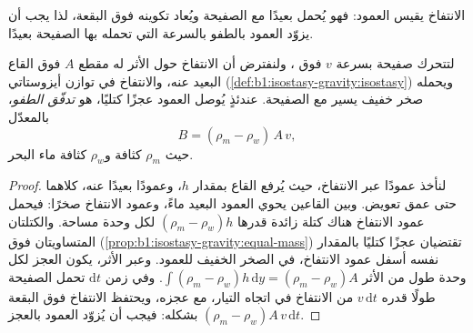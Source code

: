 الانتفاخ يقيس العمود: فهو يُحمل بعيدًا مع الصفيحة ويُعاد تكوينه فوق البقعة، لذا يجب أن يزوّد العمود بالطفو بالسرعة التي تحمله بها الصفيحة بعيدًا.

\begin{proposition}\label{prop:b1:hotspots:buoyancy}
لتتحرك صفيحة بسرعة $v$ فوق ، ولنفترض أن الانتفاخ حول الأثر له مقطع $A$ فوق القاع البعيد عنه، والانتفاخ في توازن أيزوستاتي (\cref{def:b1:isostasy-gravity:isostasy}) ويحمله صخر خفيف يسير مع الصفيحة. عندئذٍ يُوصل العمود عجزًا كتليًا، هو \emph{تدفّق الطفو}، بالمعدّل
\[
  B = (\rho_m - \rho_w)\,A\,v ,
\]
حيث $\rho_m$ كثافة  و$\rho_w$ كثافة ماء البحر.
\end{proposition}

\begin{proof}
لنأخذ عمودًا عبر الانتفاخ، حيث يُرفع القاع بمقدار $h$، وعمودًا بعيدًا عنه، كلاهما حتى عمق تعويض. وبين القاعين يحوي العمود البعيد ماءً، وعمود الانتفاخ صخرًا: فيحمل عمود الانتفاخ هناك كتلة زائدة قدرها $(\rho_m - \rho_w)h$ لكل وحدة مساحة. والكتلتان المتساويتان فوق  (\cref{prop:b1:isostasy-gravity:equal-mass}) تقتضيان عجزًا كتليًا بالمقدار نفسه أسفل عمود الانتفاخ، في الصخر الخفيف للعمود. وعبر الأثر، يكون العجز لكل وحدة طول من الأثر $\int(\rho_m - \rho_w)h\,\mathrm dy = (\rho_m - \rho_w)A$. وفي زمن $\mathrm dt$ تحمل الصفيحة طولًا قدره $v\,\mathrm dt$ من الانتفاخ في اتجاه التيار، مع عجزه، ويحتفظ الانتفاخ فوق البقعة بشكله: فيجب أن يُزوّد العمود بالعجز $(\rho_m - \rho_w)A\,v\,\mathrm dt$.
\end{proof}

